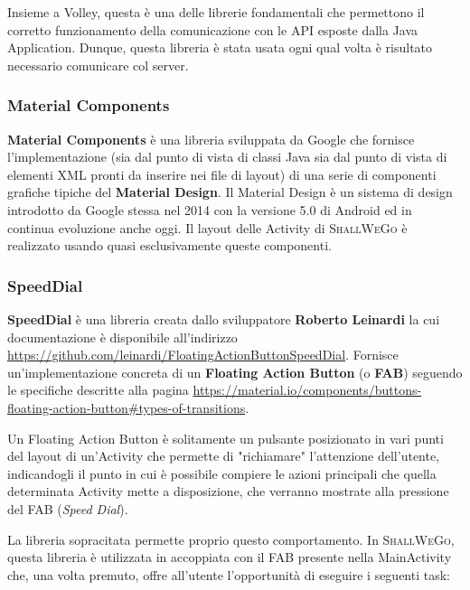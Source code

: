                     Insieme a Volley, questa è una delle librerie fondamentali che permettono il corretto funzionamento della comunicazione con le API esposte dalla Java Application. Dunque, questa libreria è stata usata ogni qual volta è risultato necessario comunicare col server.

                \subsubsection{Material Components}
                    \textbf{Material Components} è una libreria sviluppata da Google che fornisce l'implementazione (sia dal punto di vista di classi Java sia dal punto di vista di elementi XML pronti da inserire nei file di layout) di una serie di componenti grafiche tipiche del \textbf{Material Design}. Il Material Design è un sistema di design introdotto da Google stessa nel 2014 con la versione 5.0 di Android ed in continua evoluzione anche oggi. Il layout delle Activity di \textsc{ShallWeGo} è realizzato usando quasi esclusivamente queste componenti.
                
                \subsubsection{SpeedDial}
                    \textbf{SpeedDial} è una libreria creata dallo sviluppatore \textbf{Roberto Leinardi} la cui documentazione è disponibile all'indirizzo \url{https://github.com/leinardi/FloatingActionButtonSpeedDial}. Fornisce un'implementazione concreta di un \textbf{Floating Action Button} (o \textbf{FAB}) seguendo le specifiche descritte alla pagina \url{https://material.io/components/buttons-floating-action-button#types-of-transitions}.
                    
                    Un Floating Action Button è solitamente un pulsante posizionato in vari punti del layout di un'Activity che permette di "richiamare" l'attenzione dell'utente, indicandogli il punto in cui è possibile compiere le azioni principali che quella determinata Activity mette a disposizione, che verranno mostrate alla pressione del FAB (\textit{Speed Dial}).
                    
                    La libreria sopracitata permette proprio questo comportamento. In \textsc{ShallWeGo}, questa libreria è utilizzata in accoppiata con il FAB presente nella MainActivity che, una volta premuto, offre all'utente l'opportunità di eseguire i seguenti task:

